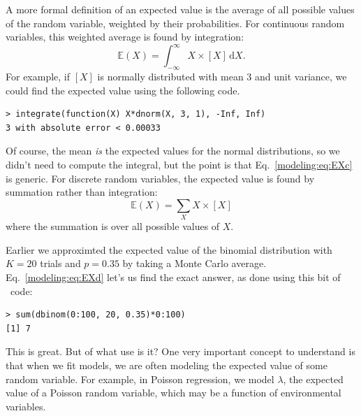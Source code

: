 A more formal definition of an expected value is the average of all
possible values of the random variable, weighted by their
probabilities. For continuous random variables, this weighted average
is found by integration: %
\begin{equation}
  \mathbb{E}(X) = \int_{-\infty}^{\infty} X \times [X] \, \text{d}{X}.
  \label{modeling:eq:EXc}
\end{equation}
For example, if $[X]$ is normally distributed with mean 3 and unit
variance, we could find the expected value using the following code.
\begin{verbatim}
> integrate(function(X) X*dnorm(X, 3, 1), -Inf, Inf)
3 with absolute error < 0.00033
\end{verbatim}
Of course, the mean \textit{is} the expected values for the normal
distributions, so we didn't need to compute the integral, but the
point is that Eq.~\ref{modeling:eq:EXc} is generic. For discrete
random variables, the expected value is found by summation rather than
integration: %
\begin{equation}
  \mathbb{E}(X) = \sum_{X} X \times [X]
  \label{modeling:eq:EXd}
\end{equation}
where the summation is over all possible values of $X$.

Earlier we
approximted the expected value of the binomial distribution
with $K=20$ trials and $p=0.35$ by taking a Monte Carlo
average. Eq.~\ref{modeling:eq:EXd} let's us
find the exact answer, as done using this bit of \R~code:
\begin{verbatim}
> sum(dbinom(0:100, 20, 0.35)*0:100)
[1] 7
\end{verbatim}
This is great. But of what use is it? One very
important concept to understand is that when we fit
models, we are often modeling the expected value of some random
variable. For example, in Poisson regression, we model $\lambda$, the
expected value of a Poisson random variable, which may be a function
of environmental variables.

